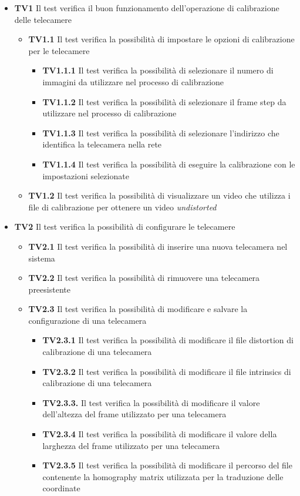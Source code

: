 \begin{itemize}
\item {\large \textbf{TV1}} Il test verifica il buon funzionamento dell'operazione di calibrazione delle telecamere
\begin{itemize}
\item \textbf{TV1.1} Il test verifica la possibilità di impostare le opzioni di calibrazione per le telecamere
\begin{itemize}
\item \textbf{TV1.1.1} Il test verifica la possibilità di selezionare il numero di immagini da utilizzare nel processo di calibrazione
\item \textbf{TV1.1.2} Il test verifica la possibilità di selezionare il frame step da utilizzare nel processo di calibrazione
\item \textbf{TV1.1.3} Il test verifica la possibilità di selezionare l'indirizzo che identifica la telecamera nella rete
\item \textbf{TV1.1.4} Il test verifica la possibilità di eseguire la calibrazione con le impostazioni selezionate
\end{itemize}
\item \textbf{TV1.2} Il test verifica la possibilità di visualizzare un video che utilizza i file di calibrazione per ottenere un video \textit{undistorted}
\end{itemize}
\item {\large \textbf{TV2}} Il test verifica la possibilità di configurare le telecamere
\begin{itemize}
\item \textbf{TV2.1} Il test verifica la possibilità di inserire una nuova telecamera nel sistema
\item \textbf{TV2.2} Il test verifica la possibilità di rimuovere una telecamera preesistente
\item \textbf{TV2.3} Il test verifica la possibilità di modificare e salvare la configurazione di una telecamera
\begin{itemize}
\item \textbf{TV2.3.1} Il test verifica la possibilità di modificare il file distortion di calibrazione di una telecamera
\item \textbf{TV2.3.2} Il test verifica la possibilità di modificare il file intrinsics di calibrazione di una telecamera
\item \textbf{TV2.3.3.} Il test verifica la possibilità di modificare il valore dell'altezza del frame utilizzato per una telecamera
\item \textbf{TV2.3.4} Il test verifica la possibilità di modificare il valore della larghezza del frame utilizzato per una telecamera
\item \textbf{TV2.3.5} Il test verifica la possibilità di modificare il percorso del file contenente la homography matrix utilizzata per la traduzione delle coordinate


\end{itemize}
\end{itemize}
\end{itemize}
